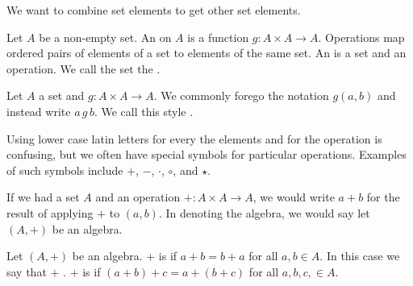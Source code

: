 
\sbasic





\sstart
{}


We want to combine set elements to get other set elements.



Let $A$ be a non-empty set.
An  on $A$ is a function $g: A \times A \to A$.
Operations map ordered pairs of elements of a set to elements of the same set.
An  is a set and an operation.
We call the set the .



Let $A$ a set and $g: A \times A \to A$.
We commonly forego the notation $g(a, b)$ and instead write $a\,g\,b$.
We call this style .

Using lower case latin letters for every the elements and for the operation is confusing, but we often have special symbols for particular operations.
Examples of such symbols include $+$, $-$, $\cdot$, $\circ$, and $\star$.

If we had a set $A$ and an operation $+: A \times A \to A$, we would write $a+b$ for the result of applying $+$ to $(a,b)$.
In denoting the algebra, we would say let $(A, +)$ be an algebra.


Let $(A, +)$ be an algebra.
$+$ is  if $a + b = b + a$ for all $a, b \in A$.
In this case we say that $+$ .
$+$ is  if $(a + b) + c = a + (b + c)$ for all $a, b, c, \in A$.


\strats
